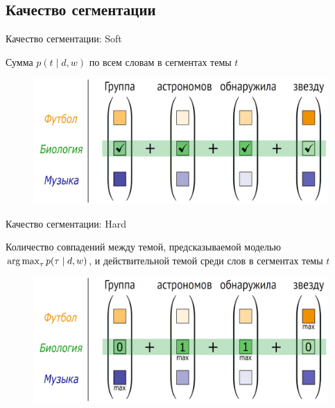 \documentclass[russian]{beamer}
\begin{document}
	
\subsection{Качество сегментации}


\begin{frame}{Качество сегментации: Soft}
  \begin{block}{}
    Сумма $p(t \mid d, w)$ по всем словам в сегментах темы $t$
  \end{block}
  
  \vspace{1.2em}
  
  \begin{figure}[h]
    \centering
    \includegraphics[width=1.0\textwidth, height=0.45\textheight]{astronomers_soft.eps} %
  \end{figure}
\end{frame}


\begin{frame}{Качество сегментации: Hard}
  \begin{block}{}
    Количество совпадений между темой, предсказываемой моделью $\operatorname*{arg\,max}_\tau p(\tau \mid d, w)$, и действительной темой среди слов в сегментах темы $t$
  \end{block}
  
  \begin{figure}[h]
    \centering
    \includegraphics[width=1.0\textwidth, height=0.45\textheight]{astronomers_strict.eps} %
  \end{figure}
\end{frame}
\end{document}
